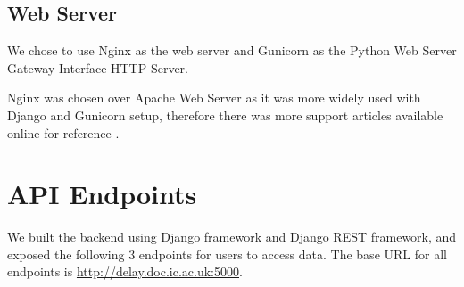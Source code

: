 \subsection{Web Server}
\label{sec:gunicorn}
We chose to use Nginx\cite{nginx} as the web server and Gunicorn\cite{gunicorn} as the Python Web Server Gateway Interface HTTP Server.

Nginx was chosen over Apache Web Server as it was more widely used with Django and Gunicorn setup, therefore there was more support articles available online for reference \cite{nginx_gunicorn_django}.

\section{API Endpoints}
\par We built the backend using Django framework and Django REST framework, and exposed the following 3 endpoints for users to access data. The base URL for all endpoints is \url{http://delay.doc.ic.ac.uk:5000}.
